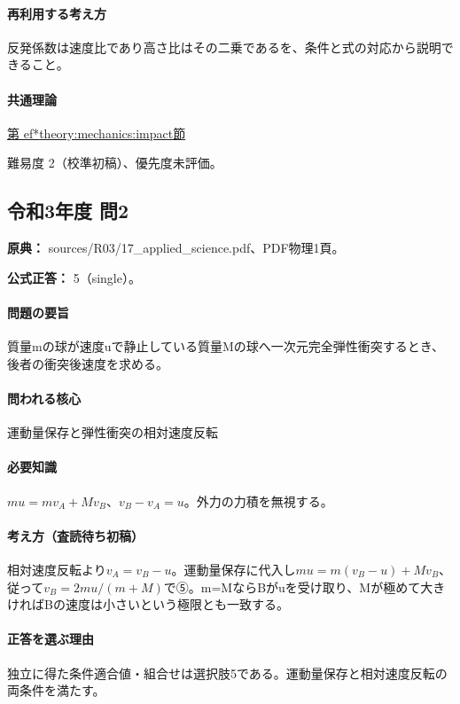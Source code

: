 \paragraph{再利用する考え方} 反発係数は速度比であり高さ比はその二乗であるを、条件と式の対応から説明できること。

\paragraph{共通理論} \hyperref[theory:mechanics:impact]{第
ef*{theory:mechanics:impact}節}

\par 難易度 2（校準初稿）、優先度未評価。

\subsection{令和3年度 問2}
\label{q:r03-reg-applied-02}

\noindent\textbf{原典：} sources/R03/17\_applied\_science.pdf、PDF物理1頁。

\textbf{公式正答：} 5（single）。

\paragraph{問題の要旨} 質量mの球が速度uで静止している質量Mの球へ一次元完全弾性衝突するとき、後者の衝突後速度を求める。

\paragraph{問われる核心} 運動量保存と弾性衝突の相対速度反転

\paragraph{必要知識} \(mu=mv_A+Mv_B\)、\(v_B-v_A=u\)。外力の力積を無視する。

\paragraph{考え方（査読待ち初稿）} 相対速度反転より\(v_A=v_B-u\)。運動量保存に代入し\(mu=m(v_B-u)+Mv_B\)、従って\(v_B=2mu/(m+M)\)で⑤。m=MならBがuを受け取り、Mが極めて大きければBの速度は小さいという極限とも一致する。

\paragraph{正答を選ぶ理由} 独立に得た条件適合値・組合せは選択肢5である。運動量保存と相対速度反転の両条件を満たす。

